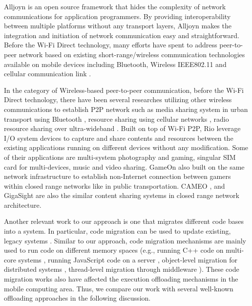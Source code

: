 \documentclass{sig-alternate}
\begin{document}
Alljoyn \cite{alljoyn} is an open source framework that hides the complexity of network communications for application programmers. By providing interoperability between multiple platforms without any transport layers, Alljoyn makes the integration and initiation of network communication easy and straightforward. Before the Wi-Fi Direct technology, many efforts have spent to address peer-to-peer network based on existing short-range/wireless communication technologies available on mobile devices including Bluetooth, Wireless IEEE802.11 and cellular communication link \cite{m_p2p_tutor,bella+:context_aware_mid}. 

In the category of Wireless-based peer-to-peer communication, before the Wi-Fi Direct technology, there have been several researches utilizing other wireless communications to establish P2P network such as media sharing system in urban transport using Bluetooth \cite{media_share}, resource sharing using cellular networks \cite{chia+:res_share}, radio resource sharing over ultra-wideband \cite{cuomo+:radio_share}. Built on top of Wi-Fi P2P, Rio \cite{rio} leverage I/O system devices to capture and share contents and resources between the existing applications running on different devices without any modification. Some of their applications are multi-system photography and gaming, singular SIM card for multi-devices, music and video sharing. GameOn \cite{gameon} also built on the same network infrastructure to establish non-Internet connection between gamers within closed range networks like in public transportation. CAMEO \cite{cameo}, and GigaSight \cite{crowd-sourcing} are also the similar content sharing systems in closed range network architecture.



Another relevant work to our approach is one that migrates different code bases into a system. In particular, code migration can be used to update existing, legacy systems \cite{Emmerich:2000:IIC:337180.337227}. Similar to our approach, code migration mechanisms are mainly used to run code on different memory spaces (e.g., running C++ code on multi-core systems \cite{Cooper:2010:OAC:2174824.2174856}, running JavaScript code on a server \cite{Tseng:2015:MJM:2695664.2695987}, object-level migration for distributed systems \cite{Yoshida:2007:CMC:1378063.1378069}, thread-level migration through middleware \cite{Truyen:2000:PST:647629.732581}). These code migration works also have affected the execution offloading mechanisms in the mobile computing area. Thus, we compare our work with several well-known offloading approaches in the following discussion.
\end{document}
